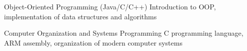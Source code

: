 

\begin{cvskills}

  \cvskill
    {Object-Oriented Programming (Java/C/C++)} %
    {Introduction to OOP, implementation of data structures and algorithms} %
    
  
  \cvskill
    {Computer Organization and Systems Programming} %
    {C programming language, ARM assembly, organization of modern computer systems} %


\end{cvskills}
